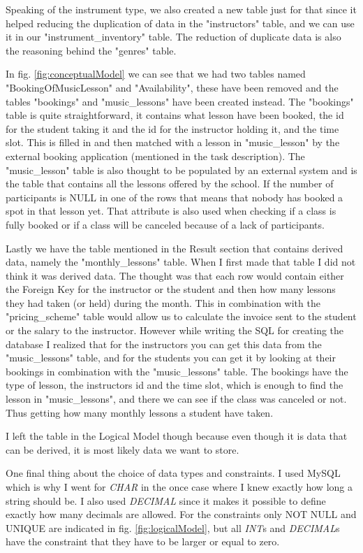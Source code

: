 \documentclass[a4paper]{scrreprt}
\begin{document}
Speaking of the instrument type, we also created a new table just for that since it helped reducing the duplication of data in the "instructors" table, and we can use 
it in our "instrument\_inventory" table. The reduction of duplicate data is also the reasoning behind the "genres" table.

In fig. \ref{fig:conceptualModel} we can see that we had two tables named "BookingOfMusicLesson" and "Availability", these have been removed and the tables "bookings"
and "music\_lessons" have been created instead. The "bookings" table is quite straightforward, it contains what lesson have been booked, the id for the student taking it
and the id for the instructor holding it, and the time slot. This is filled in and then matched with a lesson in "music\_lesson" by the external booking application (mentioned in the
task description). The "music\_lesson" table is also thought to be populated by an external system and is the table that contains all the lessons offered by the school.
If the number of participants is NULL in one of the rows that means that nobody has booked a spot in that lesson yet. That attribute is also used when checking if a
class is fully booked or if a class will be canceled because of a lack of participants.

Lastly we have the table mentioned in the Result section that contains derived data, namely the "monthly\_lessons" table. When I first made that table I did not think it 
was derived data. The thought was that each row would contain either the Foreign Key for the instructor or the student and then how many lessons they had taken (or held)
during the month. This in combination with the "pricing\_scheme" table would allow us to calculate the invoice sent to the student or the salary to the instructor. 
However while writing the SQL for creating the database I realized that for the instructors you can get this data from the "music\_lessons" table, and for the students
you can get it by looking at their bookings in combination with the "music\_lessons" table. The bookings have the type of lesson, the instructors id and the time slot, 
which is enough to find the lesson in "music\_lessons", and there we can see if the class was canceled or not. Thus getting how many monthly lessons a student have taken.

I left the table in the Logical Model though because even though it is data that can be derived, it is most likely data we want to store. 

One final thing about the choice of data types and constraints. I used MySQL which is why I went for \textit{CHAR} in the once case where I knew exactly how long a 
string should be. I also used \textit{DECIMAL} since it makes it possible to define exactly how many decimals are allowed. For the constraints only NOT NULL and UNIQUE
are indicated in fig. \ref{fig:logicalModel}, but all \textit{INT}s and \textit{DECIMAL}s have the constraint that they have to be larger or equal to zero.
\end{document}
